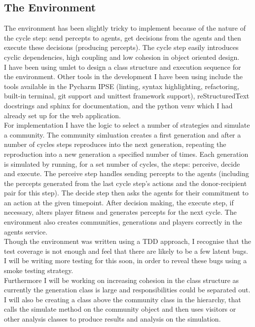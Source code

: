 \documentclass[]{final_report}
\begin{document}
\subsection{The Environment}
The environment has been slightly tricky to implement because of the nature of the cycle step: send percepts to agents, get decisions from the agents and then execute these decisions (producing percepts). The cycle step easily introduces cyclic dependencies, high coupling and low cohesion in object oriented design.\\
I have been using umlet to design a class structure and execution sequence for the environment. Other tools in the development I have been using include the tools available in the Pycharm IPSE (linting, syntax highlighting, refactoring, built-in terminal, git support and unittest framework support), reStructuredText docstrings and sphinx for documentation, and the python venv which I had already set up for the web application.\\
For implementation I have the logic to select a number of strategies and simulate a community. The community simluation creates a first generation and after a number of cycles steps reproduces into the next generation, repeating the reproduction into a new generation a specified number of times. Each generation is simulated by running, for a set number of cycles, the steps: perceive, decide and execute. The perceive step handles sending percepts to the agents (including the percepts generated from the last cycle step's actions and the donor-recipient pair for this step). The decide step then asks the agents for their commitment to an action at the given timepoint. After decision making, the execute step, if necessary, alters player fitness and generates percepts for the next cycle. The environment also creates communities, generations and players correctly in the agents service.\\
Though the environment was written using a TDD approach, I recognise that the test coverage is not enough and feel that there are likely to be a few latent bugs. I will be writing more testing for this soon, in order to reveal these bugs using a smoke testing strategy. \\
Furthermore I will be working on increasing cohesion in the class structure as currently the generation class is large and responsibilities could be separated out. I will also be creating a class above the community class in the hierarchy, that calls the simulate method on the community object and then uses visitors or other analysis classes to produce results and analysis on the simulation.
\end{document}
